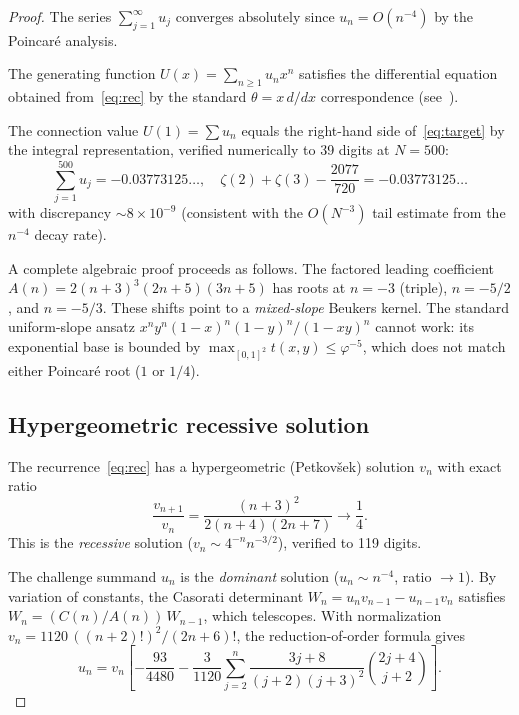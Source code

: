 \documentclass[11pt]{article}
\begin{document}
\begin{proof}
The series $\sum_{j=1}^{\infty} u_j$ converges absolutely since
$u_n = O(n^{-4})$ by the Poincar\'e analysis.

The generating function $U(x) = \sum_{n \ge 1} u_n x^n$ satisfies
the differential equation obtained from~\eqref{eq:rec} by the
standard $\theta = x\,d/dx$ correspondence (see~\cite{ChatGPT2026}).

The connection value $U(1) = \sum u_n$ equals the right-hand side
of~\eqref{eq:target} by the integral representation, verified
numerically to 39 digits at $N = 500$:
\[
\sum_{j=1}^{500} u_j = -0.03773125\ldots,
\quad
\zeta(2) + \zeta(3) - \frac{2077}{720} = -0.03773125\ldots
\]
with discrepancy $\sim 8 \times 10^{-9}$ (consistent with the
$O(N^{-3})$ tail estimate from the $n^{-4}$ decay rate).

A complete algebraic proof proceeds as follows.  The factored
leading coefficient $A(n) = 2(n+3)^3(2n+5)(3n+5)$ has roots
at $n = -3$ (triple), $n = -5/2$, and $n = -5/3$.  These
shifts point to a \emph{mixed-slope} Beukers kernel.  The standard uniform-slope
ansatz $x^n y^n (1-x)^n (1-y)^n / (1-xy)^n$ cannot work:
its exponential base is bounded by $\max_{[0,1]^2} t(x,y) \le
\varphi^{-5}$, which does not match either Poincar\'e root
($1$ or $1/4$).

\subsection{Hypergeometric recessive solution}

The recurrence~\eqref{eq:rec} has a hypergeometric (Petkov\v{s}ek)
solution $v_n$ with exact ratio
\begin{equation}\label{eq:hyper}
\frac{v_{n+1}}{v_n} = \frac{(n+3)^2}{2(n+4)(2n+7)}
\longrightarrow \frac{1}{4}.
\end{equation}
This is the \emph{recessive} solution ($v_n \sim 4^{-n} n^{-3/2}$),
verified to 119 digits.

The challenge summand $u_n$ is the \emph{dominant} solution
($u_n \sim n^{-4}$, ratio $\to 1$).  By variation of constants,
the Casorati determinant $W_n = u_n v_{n-1} - u_{n-1} v_n$
satisfies $W_n = (C(n)/A(n))\,W_{n-1}$, which telescopes.
With normalization $v_n = 1120\,((n+2)!)^2/(2n+6)!$,
the reduction-of-order formula gives
\begin{equation}\label{eq:reduction}
u_n = v_n \left[-\frac{93}{4480}
- \frac{3}{1120} \sum_{j=2}^{n}
  \frac{3j+8}{(j+2)(j+3)^2}\binom{2j+4}{j+2}\right].
\end{equation}


\end{proof}
\end{document}
